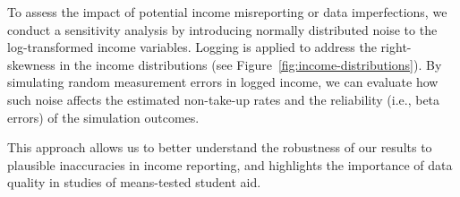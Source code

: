 To assess the impact of potential income misreporting or data imperfections, we conduct a sensitivity analysis by introducing normally distributed noise to the log-transformed income variables. 
Logging is applied to address the right-skewness in the income distributions (see Figure~\ref{fig:income-distributions}). 
By simulating random measurement errors in logged income, we can evaluate how such noise affects the estimated non-take-up rates and the reliability (i.e., beta errors) of the simulation outcomes.

This approach allows us to better understand the robustness of our results to plausible inaccuracies in income reporting, and highlights the importance of data quality in studies of means-tested student aid.
